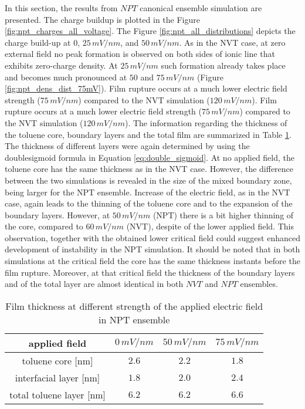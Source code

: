 In this section, the results from $NPT$ canonical ensemble simulation are presented. 
The charge  build\textendash up is plotted in the Figure \ref{fig:npt_charges_all_voltage}.
The Figure \ref{fig:npt_all_distributions} depicts the charge build-up at $0$, $25\, mV/nm$,  and $50\, mV/nm$. As in the NVT case, at zero external field no peak formation is observed on both sides of ionic line that exhibits zero-charge density. At $25\, mV/nm$ such formation already takes place and becomes much pronounced at $50$ and $75\, mV/nm$ (Figure \ref{fig:npt_dens_dist_75mV}).  Film rupture occurs at a much lower electric field strength ($75\,  mV/nm$) compared to the NVT simulation ($120\, mV/nm$). Film rupture occurs at a much lower electric field strength ($75\, mV/nm$) compared to the NVT simulation ($120\, mV/nm$). The information regarding the thickness of the toluene core, boundary layers and the total film are summarized in Table \ref{table:npt_film_thickness}. The thickness of different layers were again determined by using the double\textendash sigmoid formula in Equation \ref{eq:double_sigmoid}. At no applied field, the toluene core has the same thickness as in the NVT case. However, the difference between the two simulations is revealed in the size of the mixed boundary zone, being larger for the NPT ensemble. Increase of the electric field, as in the NVT case, again leads to the thinning of the toluene core and to the expansion of the boundary layers. However, at $50\, mV/nm$ (NPT) there is a bit higher thinning of the core, compared to $60\, mV/nm$ (NVT), despite of the lower applied field. This observation, together with the obtained lower critical field could suggest enhanced development of instability in the NPT simulation. It should be noted that in both simulations at the  critical field  the core has the same thickness instants before the film rupture.  Moreover, at that critical field the thickness of the boundary layers and of the total layer are almost identical in both $NVT$ and $NPT$ ensembles.
\begin{center}
\begin{table}[ht]
\centering
\begin{tabular}{|c|c|c|c|}
\hline
applied field           &$0\, mV/nm$   &$50\, mV/nm$   &$75\, mV/nm$   \\ \hline
toluene core [nm]       &$2.6$         &$2.2$          &$1.8$          \\ \hline
interfacial layer [nm]  &$1.8$         &$2.0$          &$2.4$    \\ \hline
total toluene layer [nm]  &$6.2$         &$6.2$          &$6.6$    \\ \hline
\end{tabular}
\caption{Film thickness at different strength of the applied electric field in NPT ensemble }
\label{table:npt_film_thickness}
\end{table}
\end{center}



